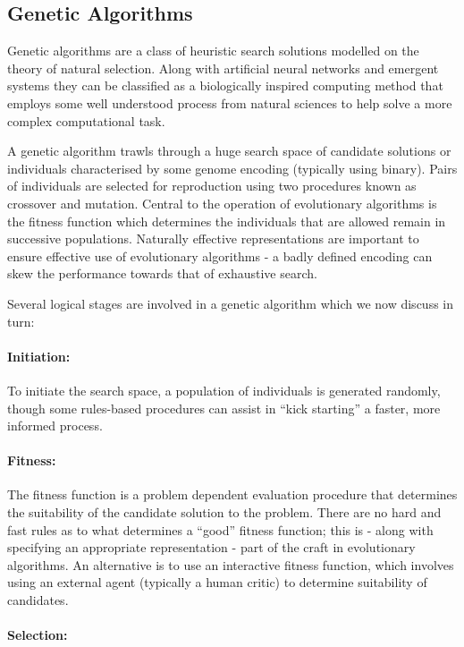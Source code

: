 \subsection{Genetic Algorithms}

Genetic algorithms are a class of heuristic search solutions modelled on the theory of natural selection. Along with artificial neural networks and emergent systems they can be classified as a biologically inspired computing method that employs some well understood  process from natural sciences to help solve a more complex computational task.

A genetic algorithm trawls through a huge search space of candidate solutions or individuals characterised by some genome encoding (typically using binary). Pairs of individuals are selected for reproduction using two procedures known as crossover and mutation. Central to the operation of evolutionary algorithms is the fitness function which determines the individuals that are allowed remain in successive populations. Naturally effective representations are important to ensure effective use of evolutionary algorithms - a badly defined encoding can skew the performance towards that of exhaustive search. 

Several logical stages are involved in a genetic algorithm which we now discuss in turn:

\paragraph{Initiation:}
To initiate the search space, a population of individuals is generated randomly, though some rules-based procedures can assist in “kick starting” a faster, more informed process.

\paragraph{Fitness:}
The fitness function is a problem dependent evaluation procedure that determines the suitability of the candidate solution to the problem. There are no hard and fast rules as to what determines a “good” fitness function; this is - along with specifying an appropriate representation - part of the craft in evolutionary algorithms. An alternative is to use an interactive fitness function, which involves using an external agent (typically a human critic) to determine suitability of candidates. 

\paragraph{Selection:}

